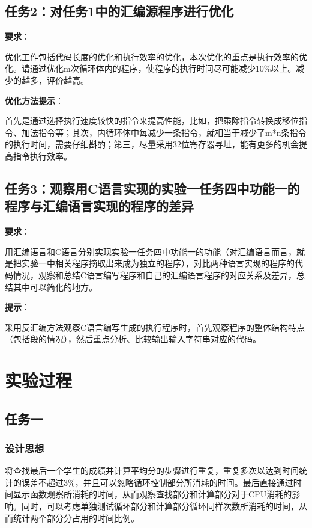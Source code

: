 \documentclass{article}
\begin{document}
	\subsection[任务2]{任务2：对任务1中的汇编源程序进行优化}
	{\textbf{要求}}： \par
	优化工作包括代码长度的优化和执行效率的优化，本次优化的重点是执行效率的优化。请通过优化m次循环体内的程序，使程序的执行时间尽可能减少10\%以上。减少的越多，评价越高。 \par
	{\textbf{优化方法提示}}： \par
	首先是通过选择执行速度较快的指令来提高性能，比如，把乘除指令转换成移位指令、加法指令等；其次，内循环体中每减少一条指令，就相当于减少了m*n条指令的执行时间，需要仔细斟酌；第三，尽量采用32位寄存器寻址，能有更多的机会提高指令执行效率。

	\subsection[任务3]{任务3：观察用C语言实现的实验一任务四中功能一的程序与汇编语言实现的程序的差异}
	{\textbf{要求}}： \par
	用汇编语言和C语言分别实现实验一任务四中功能一的功能（对汇编语言而言，就是把实验一中相关程序摘取出来成为独立的程序），对比两种语言实现的程序的代码情况，观察和总结C语言编写程序和自己的汇编语言程序的对应关系及差异，总结其中可以简化的地方。 \par
	{\textbf{提示}}： \par
	采用反汇编方法观察C语言编写生成的执行程序时，首先观察程序的整体结构特点（包括段的情况），然后重点分析、比较输出输入字符串对应的代码。

	\newpage
	\section{实验过程}
	\subsection{任务一}
	\subsubsection{设计思想}
	将查找最后一个学生的成绩并计算平均分的步骤进行重复，重复多次以达到时间统计的误差不超过3\%，并且可以忽略循环控制部分所消耗的时间。最后直接通过时间显示函数观察所消耗的时间，从而观察查找部分和计算部分对于CPU消耗的影响。同时，可以考虑单独测试循环部分和计算部分循环同样次数所消耗的时间，从而统计两个部分分占用的时间比例。
\end{document}
